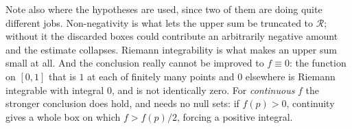 \begin{exercisesolution}
\begin{remark}
Note also where the hypotheses are used, since two of them are doing quite different jobs.
Non-negativity is what lets the upper sum be truncated to $\mathcal{R}$; without it the discarded
boxes could contribute an arbitrarily negative amount and the estimate collapses. Riemann
integrability is what makes an upper sum small at all. And the conclusion really cannot be
improved to $f \equiv 0$: the function on $[0,1]$ that is $1$ at each of finitely many points and
$0$ elsewhere is Riemann integrable with integral $0$, and is not identically zero. For
\emph{continuous} $f$ the stronger conclusion does hold, and needs no null sets: if
$f(p) > 0$, continuity gives a whole box on which $f > f(p)/2$, forcing a positive integral.
\end{remark}
\end{exercisesolution}

